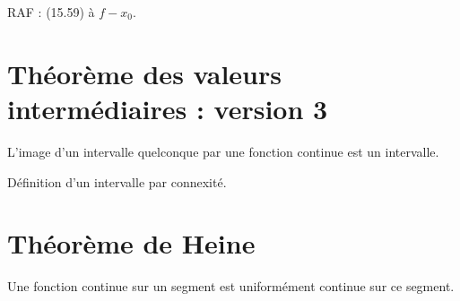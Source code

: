 \documentclass[../main.tex]{subfiles}
\begin{document}
RAF : (15.59) à $f - x_0$. 

\section{Théorème des valeurs intermédiaires : version 3}
\begin{tcolorbox}[title=Théorème 15.61, title filled=false, colframe=orange, colback=orange!10!white]
    L'image d'un intervalle quelconque par une fonction continue est un intervalle. 
\end{tcolorbox}

Définition d'un intervalle par connexité. 

\setcounter{section}{64}
\section{Théorème de Heine}
\begin{tcolorbox}[title=Théorème 15.65, title filled=false, colframe=orange, colback=orange!10!white]
    Une fonction continue sur un segment est uniformément continue sur ce segment. 
\end{tcolorbox}
\end{document}
